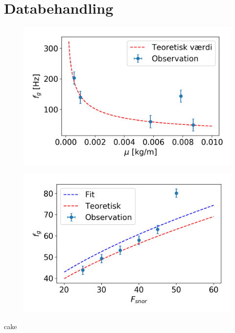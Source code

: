 \section{Databehandling}
\begin{figure}
    \includegraphics{frekvensMu.png}
    \caption{}
    \label{fig:frekvensMu}
\end{figure}

\begin{figure}
    \includegraphics{frekvensSnorSpaending.png}
    \caption{}
    \label{fig:frekvensSNor}
\end{figure}
cake
